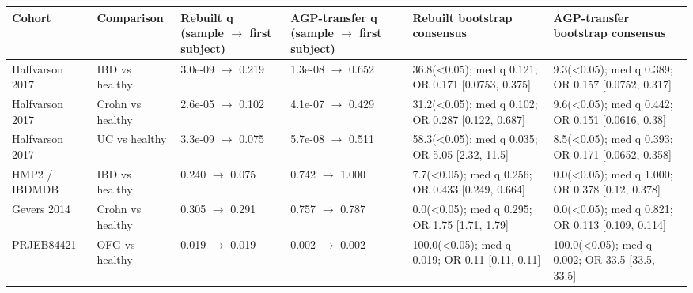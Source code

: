 \begin{center}
\scriptsize
\begin{tabularx}{\textwidth}{@{} l l Y Y Y Y @{}}
\toprule
Cohort & Comparison & Rebuilt q (sample $\rightarrow$ first subject) & AGP-transfer q (sample $\rightarrow$ first subject) & Rebuilt bootstrap consensus & AGP-transfer bootstrap consensus
 \\
\midrule
Halfvarson 2017 & IBD vs healthy & 3.0e-09 $\rightarrow$ 0.219 & 1.3e-08 $\rightarrow$ 0.652 & 36.8\;(<0.05); med q 0.121; OR 0.171 [0.0753, 0.375] & 9.3\;(<0.05); med q 0.389; OR 0.157 [0.0752, 0.317] \\
Halfvarson 2017 & Crohn vs healthy & 2.6e-05 $\rightarrow$ 0.102 & 4.1e-07 $\rightarrow$ 0.429 & 31.2\;(<0.05); med q 0.102; OR 0.287 [0.122, 0.687] & 9.6\;(<0.05); med q 0.442; OR 0.151 [0.0616, 0.38] \\
Halfvarson 2017 & UC vs healthy & 3.3e-09 $\rightarrow$ 0.075 & 5.7e-08 $\rightarrow$ 0.511 & 58.3\;(<0.05); med q 0.035; OR 5.05 [2.32, 11.5] & 8.5\;(<0.05); med q 0.393; OR 0.171 [0.0652, 0.358] \\
HMP2 / IBDMDB & IBD vs healthy & 0.240 $\rightarrow$ 0.075 & 0.742 $\rightarrow$ 1.000 & 7.7\;(<0.05); med q 0.256; OR 0.433 [0.249, 0.664] & 0.0\;(<0.05); med q 1.000; OR 0.378 [0.12, 0.378] \\
Gevers 2014 & Crohn vs healthy & 0.305 $\rightarrow$ 0.291 & 0.757 $\rightarrow$ 0.787 & 0.0\;(<0.05); med q 0.295; OR 1.75 [1.71, 1.79] & 0.0\;(<0.05); med q 0.821; OR 0.113 [0.109, 0.114] \\
PRJEB84421 & OFG vs healthy & 0.019 $\rightarrow$ 0.019 & 0.002 $\rightarrow$ 0.002 & 100.0\;(<0.05); med q 0.019; OR 0.11 [0.11, 0.11] & 100.0\;(<0.05); med q 0.002; OR 33.5 [33.5, 33.5] \\
\bottomrule
\end{tabularx}
\end{center}

